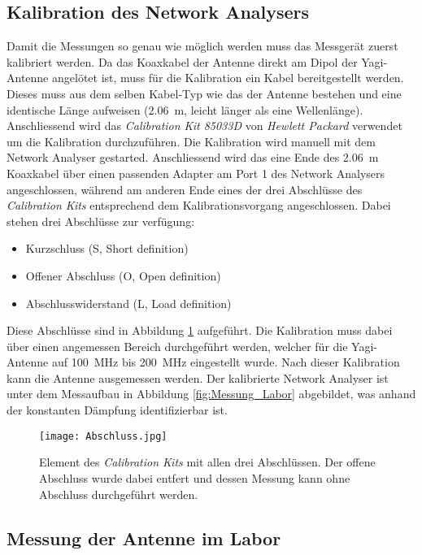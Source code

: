 \subsection{Kalibration des Network Analysers}

Damit die Messungen so genau wie möglich werden muss das Messgerät zuerst kalibriert werden. Da das Koaxkabel der Antenne direkt am Dipol der Yagi-Antenne angelötet ist, muss für die Kalibration ein Kabel bereitgestellt werden. Dieses muss aus dem selben Kabel-Typ wie das der Antenne bestehen und eine identische Länge aufweisen (\SI{2.06}{m}, leicht länger als eine Wellenlänge). Anschliessend wird das \textit{Calibration Kit 85033D} von \textit{Hewlett Packard} verwendet um die Kalibration durchzuführen. Die Kalibration wird manuell mit dem Network Analyser gestarted. Anschliessend wird das eine Ende des \SI{2.06}{m} Koaxkabel über einen passenden Adapter am Port 1 des Network Analysers angeschlossen, während am anderen Ende eines der drei Abschlüsse des \textit{Calibration Kits} entsprechend dem Kalibrationsvorgang angeschlossen. Dabei stehen drei Abschlüsse zur verfügung:

\begin{itemize}
\item Kurzschluss (S, Short definition)
\item Offener Abschluss (O, Open definition)
\item Abschlusswiderstand (L, Load definition)
\end{itemize}

Diese Abschlüsse sind in Abbildung \ref{fig:Messung_Abschluss} aufgeführt. Die Kalibration muss dabei über einen angemessen Bereich durchgeführt werden, welcher für die Yagi-Antenne auf \SI{100}{MHz} bis \SI{200}{MHz} eingestellt wurde. Nach dieser Kalibration kann die Antenne ausgemessen werden. Der kalibrierte Network Analyser ist unter dem Messaufbau in Abbildung \ref{fig:Messung_Labor} abgebildet, was anhand der konstanten Dämpfung identifizierbar ist.

\begin{figure}[h!]
	\centering
	\texttt{[image: Abschluss.jpg]}
	\caption{Element des \textit{Calibration Kits} mit allen drei Abschlüssen. Der offene Abschluss wurde dabei entfert und dessen Messung kann ohne Abschluss durchgeführt werden.}
	\label{fig:Messung_Abschluss}
\end{figure}


\subsection{Messung der Antenne im Labor}

